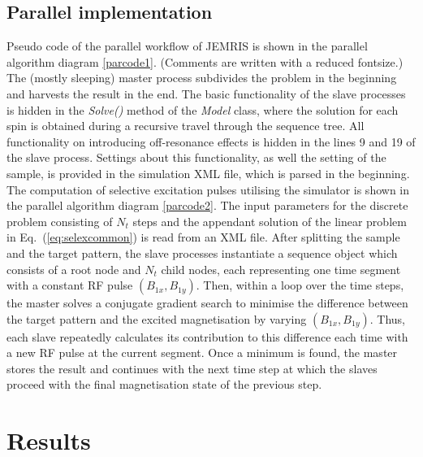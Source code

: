 \documentclass{nic-series}
\begin{document}
\subsection{Parallel implementation}
Pseudo code of the parallel workflow of JEMRIS is shown in the parallel algorithm diagram \ref{parcode1}. (Comments
are written with a reduced fontsize.) The (mostly sleeping) master process subdivides the problem
in the beginning and harvests the result in the end. The basic functionality of the slave processes is hidden
in the {\it Solve()} method of the {\it Model} class, where the solution for each spin is obtained during a recursive
travel through the sequence tree. All functionality on introducing off-resonance effects is hidden in the
lines {\footnotesize 9} and {\footnotesize 19} of the slave process. Settings about this functionality, as well the
setting of the sample, is provided in the simulation XML file, which is parsed in the \medskip beginning.\\
The computation of selective excitation pulses utilising the simulator is shown in the parallel algorithm diagram \ref{parcode2}.
The input parameters for the discrete problem consisting of $N_t$ steps and the appendant solution of the linear problem  
in Eq.~(\ref{eq:selexcommon}) is read from an XML file. After splitting the sample and the target pattern,
the slave processes instantiate a sequence object which consists of a root node and $N_t$ child nodes, each representing
one time segment with a constant RF pulse $(B_{1x},B_{1y})$. Then, within a loop over the time steps, the master solves
a conjugate gradient search to minimise the difference between the target pattern and the excited magnetisation by varying 
$(B_{1x},B_{1y})$. Thus, each slave repeatedly calculates its contribution to this difference each time with a new RF pulse
at the current segment. Once a minimum is found, the master stores the result and continues with the next time step at which the
slaves proceed with the final magnetisation state of the previous step.
\section{Results}
\end{document}
